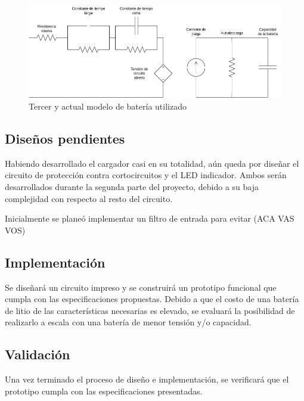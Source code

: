 \begin{figure}
    \centering
    \includegraphics[width=\textwidth]{images/bateria_3.png}
    \caption{Tercer y actual modelo de batería utilizado}
    \label{fig:bateria_3}
\end{figure}

\subsection{Diseños pendientes}
Habiendo desarrollado el cargador casi en su totalidad, aún queda por diseñar el circuito de protección
contra cortocircuitos y el LED indicador. Ambos serán desarrollados durante la segunda parte del proyecto,
debido a su baja complejidad con respecto al resto del circuito.

Inicialmente se planeó implementar un filtro de entrada para evitar (ACA VAS VOS)

\subsection{Implementación}
Se diseñará un circuito impreso y se construirá un prototipo funcional que cumpla con las especificaciones propuestas. 
Debido a que el costo de una batería de litio de las características necesarias es elevado,
se evaluará la posibilidad de realizarlo a escala con una batería de menor tensión y/o capacidad.

\subsection{Validación}
Una vez terminado el proceso de diseño e implementación,
se verificará que el prototipo cumpla con las especificaciones presentadas.